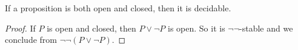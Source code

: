 \begin{corollary}\label{ClopenDecidable}
  If a proposition is both open and closed, then it is decidable. 
\end{corollary}
\begin{proof}
  If $P$ is open and closed, then 
  $P\vee \neg P$ is open. So it is $\neg\neg$-stable and we conclude from $\neg\neg(P\vee\neg P)$. 
%  
\end{proof}



